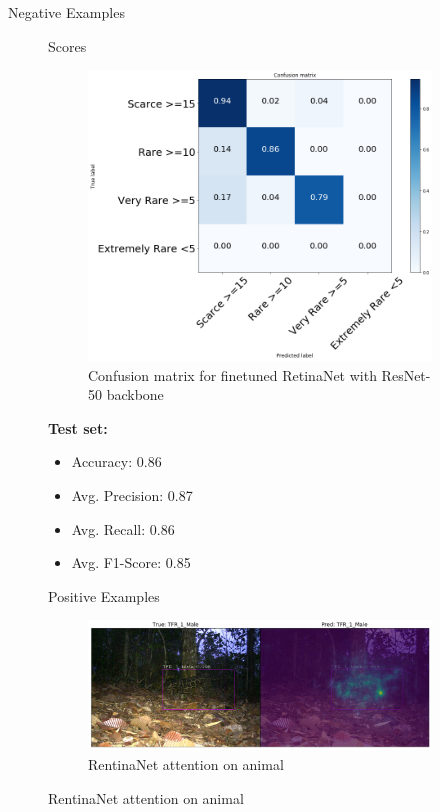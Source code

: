 \documentclass[10pt]{beamer}
\begin{document}
\begin{frame}{Negative Examples}
\begin{figure}

\begin{frame}{Scores}
	\centering
	\begin{minipage}[c]{0.58\linewidth}
		\begin{figure}
			\includegraphics[width=\columnwidth]{images/conf_mat_leo_retina.png}
			\caption{Confusion matrix for finetuned RetinaNet with ResNet-50 backbone}
		\end{figure}
	\end{minipage}
	\begin{minipage}[c]{0.38\linewidth}
		\textbf{Test set:}
		\begin{itemize}
			\item Accuracy: 0.86
			\item Avg. Precision:  0.87
			\item Avg. Recall: 0.86
			\item Avg. F1-Score: 0.85
		\end{itemize}
	\end{minipage}
\end{frame}

\begin{frame}{Positive Examples}
	\centering
	\begin{figure}
		\includegraphics[width=\columnwidth]{images/RetinaNet_Attention_correct_good_quality2.png}
		\caption{RentinaNet attention on animal}
	\end{figure}
\end{frame}


\end{figure}
\end{frame}
\end{document}
